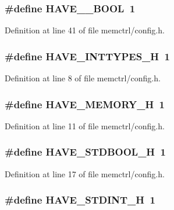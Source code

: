 \subsubsection[{HAVE\_\-\_\-BOOL}]{\setlength{\rightskip}{0pt plus 5cm}\#define HAVE\_\-\_\-BOOL~1}\label{memctrl_2config_8h_862ffdbac7ac8323712310a418b7d9a3}




Definition at line 41 of file memctrl/config.h.
\subsubsection[{HAVE\_\-INTTYPES\_\-H}]{\setlength{\rightskip}{0pt plus 5cm}\#define HAVE\_\-INTTYPES\_\-H~1}\label{memctrl_2config_8h_b90a030ff2790ebdc176660a6dd2a478}




Definition at line 8 of file memctrl/config.h.
\subsubsection[{HAVE\_\-MEMORY\_\-H}]{\setlength{\rightskip}{0pt plus 5cm}\#define HAVE\_\-MEMORY\_\-H~1}\label{memctrl_2config_8h_e93a78f9d076138897af441c9f86f285}




Definition at line 11 of file memctrl/config.h.
\subsubsection[{HAVE\_\-STDBOOL\_\-H}]{\setlength{\rightskip}{0pt plus 5cm}\#define HAVE\_\-STDBOOL\_\-H~1}\label{memctrl_2config_8h_8c3fa1b2f1be8c6f6929548c548cf50a}




Definition at line 17 of file memctrl/config.h.
\subsubsection[{HAVE\_\-STDINT\_\-H}]{\setlength{\rightskip}{0pt plus 5cm}\#define HAVE\_\-STDINT\_\-H~1}\label{memctrl_2config_8h_b6cd6d1c63c1e26ea2d4537b77148354}




